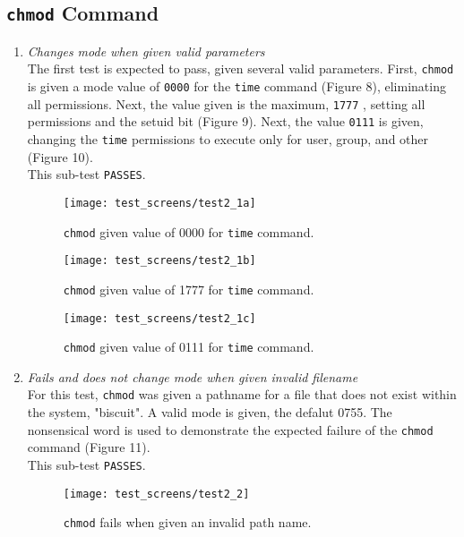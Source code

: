 \documentclass[11pt,letterpaper]{report}
\begin{document}
	\subsection{{\tt chmod} Command}
	\begin{enumerate}
		\item \emph{Changes mode when given valid parameters}\\
		The first test is expected to pass, given several valid parameters. First, {\tt chmod} is given a mode value of {\tt 0000} for the {\tt time} command ({\color{red}Figure 8}), eliminating all permissions. Next, the value given is the maximum, {\tt 1777} , setting all permissions and the setuid bit ({\color{red}Figure 9}). Next, the value {\tt 0111} is given, changing the {\tt time} permissions to execute only for user, group, and other ({\color{red}Figure 10}).\\
		This sub-test {\tt PASSES}.
		
		\begin{figure}
			\centering
			\texttt{[image: test\_screens/test2\_1a]}
			\caption{{\tt chmod} given value of 0000 for {\tt time} command.}
			\label{fig:test21a}
		\end{figure}
		
		\begin{figure}
			\centering
			\texttt{[image: test\_screens/test2\_1b]}
			\caption{{\tt chmod} given value of 1777 for {\tt time} command.}
			\label{fig:test21b}
		\end{figure}
	
		\begin{figure}
			\centering
			\texttt{[image: test\_screens/test2\_1c]}
			\caption{{\tt chmod} given value of 0111 for {\tt time} command.}
			\label{fig:test21c}
		\end{figure}


		\item \emph{Fails and does not change mode when given invalid filename}\\
		For this test, {\tt chmod} was given a pathname for a file that does not exist within the system, "biscuit". A valid mode is given, the defalut 0755. The nonsensical word is used to demonstrate the expected failure of the {\tt chmod} command ({\color{red}Figure 11}).\\
		This sub-test {\tt PASSES}. 
	
		\begin{figure}
			\centering
			\texttt{[image: test\_screens/test2\_2]}
			\caption{{\tt chmod} fails when given an invalid path name.}
			\label{fig:test22}
		\end{figure}
		

\end{enumerate}
\end{document}
